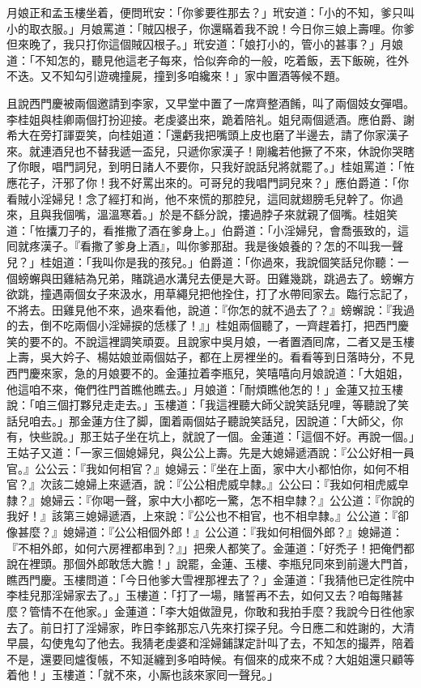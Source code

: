 月娘正和孟玉樓坐着，便問玳安：「你爹要徃那去？」玳安道：「小的不知，爹只叫小的取衣服。」月娘罵道：「賊囚根子，你還瞞着我不說！今日你三娘上壽哩。你爹但來晚了，我只打你這個賊囚根子。」玳安道：「娘打小的，管小的甚事？」月娘道：「不知怎的，聽見他這老子每來，恰似奔命的一般，吃着飯，丟下飯碗，徃外不迭。又不知勾引遊魂撞屍，撞到多咱纔來！」家中置酒等候不題。

且說西門慶被兩個邀請到李家，又早堂中置了一席齊整酒餚，叫了兩個妓女彈唱。李桂姐與桂卿兩個打扮迎接。老虔婆出來，跪着陪礼。姐兒兩個遞酒。應伯爵、謝希大在旁打諢耍笑，向桂姐道：「還虧我把嘴頭上皮也磨了半邊去，請了你家漢子來。就連酒兒也不替我遞一盃兒，只遞你家漢子！剛纔若他撅了不來，休說你哭瞎了你眼，{}唱門詞兒，到明日諸人不要你，只我好說話兒將就罷了。」桂姐罵道：「恠應花子，汗邪了你！我不好罵出來的。可哥兒的我唱門詞兒來？」應伯爵道：「你看賊小淫婦兒！念了經打和尚，他不來慌的那腔兒，這囘就翅膀毛兒幹了。你過來，且與我個嘴，溫溫寒着。」於是不繇分說，摟過脖子來就親了個嘴。桂姐笑道：「恠攮刀子的，看推撒了酒在爹身上。」伯爵道：「小淫婦兒，會喬張致的，這囘就疼漢子。『看撒了爹身上酒』，叫你爹那甜。我是後娘養的？怎的不叫我一聲兒？」桂姐道：「我叫你是我的孩兒。」伯爵道：「你過來，我說個笑話兒你聽：一個螃蠏與田雞結為兄弟，賭跳過水溝兒去便是大哥。田雞幾跳，跳過去了。螃蠏方欲跳，撞遇兩個女子來汲水，用草繩兒把他拴住，打了水帶囘家去。臨行忘記了，不將去。田雞見他不來，過來看他，說道：『你怎的就不過去了？』螃蠏說：『我過的去，倒不吃兩個小淫婦捩的恁樣了！』」桂姐兩個聽了，一齊趕着打，把西門慶笑的要不的。不說這裡調笑頑耍。且說家中吳月娘，一者置酒囘席，二者又是玉樓上壽，吳大妗子、楊姑娘並兩個姑子，都在上房裡坐的。看看等到日落時分，不見西門慶來家，急的月娘要不的。金蓮拉着李瓶兒，笑嘻嘻向月娘說道：「大姐姐，他這咱不來，俺們徃門首瞧他瞧去。」月娘道：「耐煩瞧他怎的！」{}金蓮又拉玉樓說：「咱三個打夥兒走走去。」玉樓道：「我這裡聽大師父說笑話兒哩，等聽說了笑話兒咱去。」那金蓮方住了脚，圍着兩個姑子聽說笑話兒，因說道：「大師父，你有，快些說。」那王姑子坐在坑上，就說了一個。金蓮道：「這個不好。再說一個。」{}王姑子又道：「一家三個媳婦兒，與公公上壽。先是大媳婦遞酒說：『公公好相一員官。』公公云：『我如何相官？』媳婦云：『坐在上面，家中大小都怕你，如何不相官？』次該二媳婦上來遞酒，說：『公公相虎威皁隸。』公公曰：『我如何相虎威皁隸？』媳婦云：『你喝一聲，家中大小都吃一驚，怎不相皁隸？』公公道：『你說的我好！』該第三媳婦遞酒，上來說：『公公也不相官，也不相皁隸。』公公道：『卻像甚麼？』媳婦道：『公公相個外郎！』公公道：『我如何相個外郎？』媳婦道：『不相外郎，如何六房裡都串到？』」{}把衆人都笑了。金蓮道：「好禿子！把俺們都說在裡頭。那個外郎敢恁大膽！」說罷，金蓮、玉樓、李瓶兒同來到前邊大門首，瞧西門慶。玉樓問道：「今日他爹大雪裡那裡去了？」金蓮道：「我猜他已定徃院中李桂兒那淫婦家去了。」玉樓道：「打了一場，賭誓再不去，如何又去？咱每賭甚麼？管情不在他家。」金蓮道：「李大姐做證見，你敢和我拍手麼？我說今日徃他家去了。前日打了淫婦家，昨日李銘那忘八先來打探子兒。{}今日應二和姓謝的，大清早晨，勾使鬼勾了他去。我猜老虔婆和淫婦鋪謀定計叫了去，不知怎的撮弄，陪着不是，還要囘爐復帳，不知涎纏到多咱時候。有個來的成來不成？大姐姐還只顧等着他！」玉樓道：「就不來，小厮也該來家囘一聲兒。」

